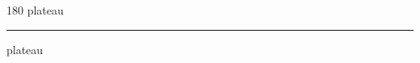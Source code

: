 
\begin{frame}
\begin{center}
\begin{turn}{180}
{\fontsize{2.5cm}{1em}\selectfont plateau}
\end{turn}
\vspace{1em}\par  
\hrule
\vspace{1em}\par  
{\fontsize{2.5cm}{1em}\selectfont plateau}
\end{center}
\end{frame}
